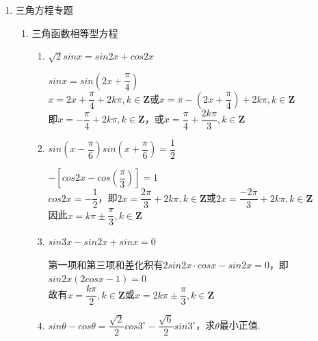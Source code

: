 \begin{enumerate}
\item 三角方程专题
    \begin{enumerate}
        \item 三角函数相等型方程
        \begin{enumerate}
            \item $\sqrt{2} sinx = sin2x + cos2x$
            \begin{jieda}
                $sinx = sin(2x+\dfrac{\pi}{4})$ \\
                $x = 2x+\dfrac{\pi}{4} + 2k\pi, k \in \mathbf{Z}$或$x = \pi - (2x+\dfrac{\pi}{4}) + 2k\pi, k \in \mathbf{Z}$ \\
                即$x = -\dfrac{\pi}{4} + 2k\pi, k \in \mathbf{Z}$，或$x = \dfrac{\pi}{4} + \dfrac{2k\pi}{3}, k \in \mathbf{Z}$
            \end{jieda}
            \item $sin\left(x - \dfrac{\pi}{6}\right) sin\left(x+\dfrac{\pi}{6}\right) = \dfrac{1}{2}$
            \begin{jieda}
                $-[cos2x - cos(\dfrac{\pi}{3})] = 1$ \\
                $cos2x = -\dfrac{1}{2}$，即$2x = \dfrac{2\pi}{3} + 2k\pi, k \in \mathbf{Z}$或$2x = \dfrac{-2\pi}{3} + 2k\pi, k \in \mathbf{Z}$ \\
                因此$x = k\pi \pm \dfrac{\pi}{3}, k \in \mathbf{Z}$
            \end{jieda}
            \item $sin3x - sin2x + sinx = 0$
            \begin{jieda}
                第一项和第三项和差化积有$2sin2x \cdot cosx - sin2x = 0$，即$sin2x(2cosx - 1) = 0$ \\
                故有$x = \dfrac{k\pi}{2}, k \in \mathbf{Z}$或$x = 2k\pi \pm \dfrac{\pi}{3}, k \in \mathbf{Z}$
            \end{jieda}
            \item $sin\theta - cos\theta = \dfrac{\sqrt{2}}{2}cos3^{\circ} - \dfrac{\sqrt{6}}{2}sin3^{\circ}$，求$\theta$最小正值.
\end{enumerate}
\end{enumerate}
\end{enumerate}
